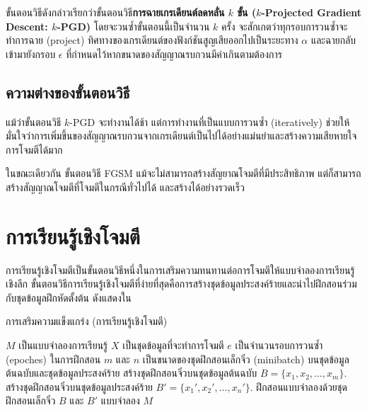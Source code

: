 ขั้นตอนวิธีดังกล่าวเรียกว่าขั้นตอนวิธี\textbf{การฉายเกรเดียนต์ลดหลั่น $k$ ขั้น ($k$-Projected Gradient Descent: $k$-PGD)} โดยจะวนซ้ำขั้นตอนนี้เป็นจำนวน $k$ ครั้ง จะสักเกตว่าทุกรอบการวนซ้ำจะทำการฉาย (project) ทิศทางของเกรเดียนต์ของฟังก์ชันสูญเสียออกไปเป็นระยะทาง $\alpha$ และฉายกลับเข้ามายังกรอบ $\epsilon$ ที่กำหนดไว้หากขนาดของสัญญาณรบกวนมีค่าเกินตามต้องการ

\subsection{ความต่างของขั้นตอนวิธี}

แม้ว่าขั้นตอนวิธี $k$-PGD จะทำงานได้ช้า แต่การทำงานที่เป็นแบบการวนซ้ำ (iteratively) ช่วยให้มั่นใจว่าการเพิ่มขึ้นของสัญญาณรบกวนจากเกรเดียนต์เป็นไปได้อย่างแม่นยำและสร้างความเสียหายใจการโจมตีได้มาก

ในขณะเดียวกัน ขั้นตอนวิธี FGSM แม้จะไม่สามารถสร้างสัญยาณโจมตีที่มีประสิทธิภาพ แต่ก็สามารถสร้างสัญญาณโจมตีที่โจมตีในกรณีทั่วไปได้ และสร้างได้อย่างรวดเร็ว

\section{การเรียนรู้เชิงโจมตี}

การเรียนรู้เชิงโจมตีเป็นขั้นตอนวิธีหนึ่งในการเสริมความทนทานต่อการโจมตีให้แบบจำลองการเรียนรู้เชิงลึก ขั้นตอนวิธีการเรียนรู้เชิงโจมตีที่ง่ายที่สุดคือการสร้างชุดข้อมูลประสงค์ร้ายและนำไปฝึกสอนร่วมกับชุดข้อมูลฝึกหัดตั้งต้น ดังแสดงใน

\begin{algorithm} 
    \caption{การเสริมความแข็งแกร่ง (การเรียนรู้เชิงโจมตี)}
    \label{retrain}
    \begin{algorithmic}
        \REQUIRE $M$ เป็นแบบจำลองการเรียนรู้
        \REQUIRE $X$ เป็นชุดข้อมูลที่จะทำการโจมตี
        \REQUIRE $e$ เป็นจำนวนรอบการวนซ้ำ (epoches) ในการฝึกสอน
        \REQUIRE $m$ และ $n$ เป็นขนาดของชุดฝึกสอนเล็กจิ๋ว (minibatch) บนชุดข้อมูลต้นฉบับและชุดข้อมูลประสงค์ร้าย
            \STATE สร้างชุดฝึกสอนจิ๋วบนชุดข้อมูลต้นฉบับ $B=\{x_1, x_2, \dots, x_m\}$.
            \STATE สร้างชุดฝึกสอนจิ๋วบนชุดข้อมูลประสงค์ร้าย $B'=\{x_1', x_2', \dots, x_n'\}$.
            \STATE ฝึกสอนแบบจำลองด้วยชุดฝึกสอนเล็กจิ๋ว $B$ และ $B'$
        \ENDFOR
        \RETURN แบบจำลอง $M$
    \end{algorithmic}
\end{algorithm}

